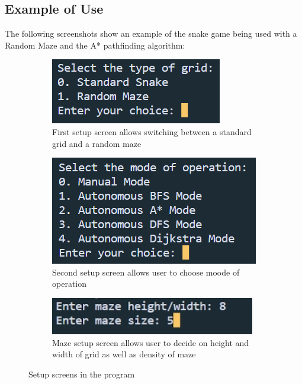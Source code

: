\documentclass[11pt]{article}
\begin{document}
\subsection{Example of Use}

The following screenshots show an example of the snake game being used with a Random Maze and the A* pathfinding algorithm:

\graphicspath{ {./images/} }

\begin{figure}[H]

\begin{subfigure}{0.3\textwidth}
    \includegraphics[scale=0.7]{Setup_1} 
    \caption{First setup screen allows switching between a standard grid and a random maze}
    \label{fig:subim1}
\end{subfigure}
\begin{subfigure}{0.3\textwidth}
    \includegraphics[scale=0.7]{Setup_2}
    \caption{Second setup screen allows user to choose moode of operation}
    \label{fig:subim2}
\end{subfigure}
\begin{subfigure}{0.3\textwidth}
    \includegraphics[scale=0.7]{Maze_Generation}
    \caption{Maze setup screen allows user to decide on height and width of grid as well as density of maze}
    \label{fig:subim3}
\end{subfigure}

\caption{Setup screens in the program}
\label{fig:image1}
\end{figure}
\end{document}

